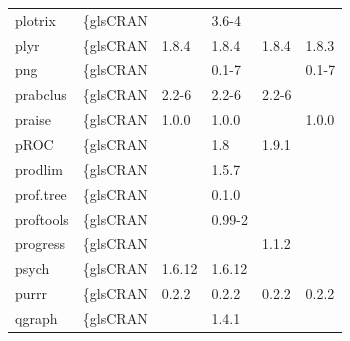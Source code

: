 \begin{longtable}{llllll}
\rowcolor{black!5}
plotrix                       & \{gls{CRAN}                      &             & 3.6-4       &                &                    \\
\rowcolor{black!10}
plyr                          & \{gls{CRAN}                      & 1.8.4       & 1.8.4       & 1.8.4          & 1.8.3             \\
\rowcolor{black!5}
png                           & \{gls{CRAN}                      &             & 0.1-7       &                & 0.1-7              \\
\rowcolor{black!10}
prabclus                      & \{gls{CRAN}                      & 2.2-6       & 2.2-6       & 2.2-6          &                   \\
\rowcolor{black!5}
praise                        & \{gls{CRAN}                      & 1.0.0       & 1.0.0       &                & 1.0.0              \\
\rowcolor{black!10}
pROC                          & \{gls{CRAN}                      &             & 1.8         & 1.9.1          &                   \\
\rowcolor{black!5}
prodlim                       & \{gls{CRAN}                      &             & 1.5.7       &                &                    \\
\rowcolor{black!10}
prof.tree                     & \{gls{CRAN}                      &             & 0.1.0       &                &                   \\
\rowcolor{black!5}
proftools                     & \{gls{CRAN}                      &             & 0.99-2      &                &                    \\
\rowcolor{black!10}
progress                      & \{gls{CRAN}                      &             &             & 1.1.2          &                   \\
\rowcolor{black!5}
psych                         & \{gls{CRAN}                      & 1.6.12      & 1.6.12      &                &                    \\
\rowcolor{black!10}
purrr                         & \{gls{CRAN}                      & 0.2.2       & 0.2.2       & 0.2.2          & 0.2.2             \\
\rowcolor{black!5}
qgraph                        & \{gls{CRAN}                      &             & 1.4.1       &                &                    \\

\end{longtable}
